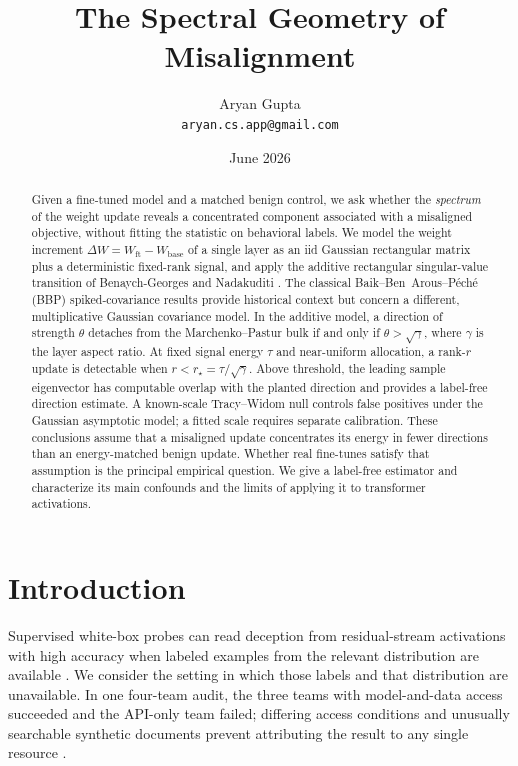 \documentclass[11pt]{article}
\title{\bfseries The Spectral Geometry of Misalignment}
\author{Aryan Gupta\\ \texttt{aryan.cs.app@gmail.com}}
\date{June 2026}
\theoremstyle{definition}
\theoremstyle{remark}
\newcommand{\dW}{\Delta W}
\begin{document}
\maketitle

\begin{abstract}
\noindent
Given a fine-tuned model and a matched benign control, we ask whether the
\emph{spectrum} of the weight update reveals a concentrated component associated
with a misaligned objective, without fitting the statistic on behavioral labels.
We model the weight increment $\dW = W_{\mathrm{ft}} - W_{\mathrm{base}}$ of a single
layer as an iid Gaussian rectangular matrix plus a deterministic fixed-rank signal,
and apply the additive rectangular singular-value transition of
Benaych-Georges and Nadakuditi \cite{benaych2012}. The classical
Baik--Ben~Arous--P\'ech\'e (BBP) spiked-covariance results
\cite{bbp2005,baik2006,paul2007} provide historical context but concern a
different, multiplicative Gaussian covariance model.
In the additive model, a direction of strength $\theta$ detaches from the
Marchenko--Pastur bulk \cite{marchenko1967} if and only if
$\theta>\sqrt\gamma$, where $\gamma$ is the layer aspect ratio. At fixed signal
energy $\tau$ and near-uniform allocation, a rank-$r$ update is detectable when
$r<r_\star=\tau/\sqrt\gamma$. Above threshold, the leading sample eigenvector
has computable overlap with the planted direction and provides a label-free
direction estimate. A known-scale Tracy--Widom null
\cite{tracywidom1996,johnstone2001} controls false positives under the Gaussian
asymptotic model; a fitted scale requires separate calibration. These conclusions
assume that a misaligned update concentrates its energy in fewer directions than
an energy-matched benign update. Whether real fine-tunes satisfy that assumption
is the principal empirical question. We give a label-free estimator and
characterize its main confounds and the limits of applying it to transformer
activations.
\end{abstract}

\section{Introduction}
\label{sec:intro}

Supervised white-box probes can read deception from residual-stream activations with
high accuracy when labeled examples from the relevant distribution are available
\cite{goldowskydill2025}. We consider the setting in which those labels and that
distribution are unavailable. In one four-team audit, the three teams with
model-and-data access succeeded and the API-only team failed; differing access
conditions and unusually searchable synthetic documents prevent attributing the
result to any single resource \cite{marks2025}.
\end{document}
